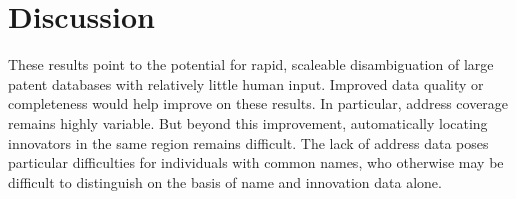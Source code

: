 \documentclass[11pt]{article}
\begin{document}





\section{Discussion}
\label{sec:discussion}

These results point to the potential for rapid, scaleable
disambiguation of large patent databases with relatively little human
input. Improved data quality or completeness would help improve on
these results. In particular, address coverage remains highly
variable. But beyond this improvement, automatically
locating innovators in the same region remains difficult. The lack of
address data poses particular difficulties for individuals with common
names, who otherwise may be difficult to distinguish on the basis of
name and innovation data alone.
\end{document}
